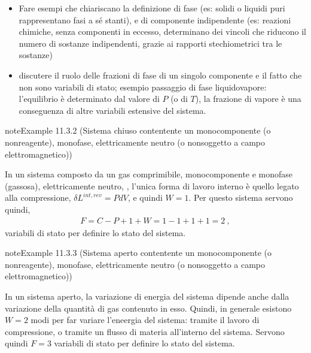 \documentclass[letterpaper,10pt,italian]{jupyterBook}
\begin{document}
\sphinxAtStartPar
{}
\begin{itemize}
\item {} 
\sphinxAtStartPar
Fare esempi che chiariscano la definizione di fase (es: solidi o liquidi puri rappresentano fasi a sé stanti), e di componente indipendente (es: reazioni chimiche, senza componenti in eccesso, determinano dei vincoli che riducono il numero di sostanze indipendenti, grazie ai rapporti stechiometrici tra le sostanze)

\item {} 
\sphinxAtStartPar
discutere il ruolo delle frazioni di fase di un singolo componente e il fatto che non sono variabili di stato; esempio passaggio di fase liquido\sphinxhyphen{}vapore: l’equilibrio è determinato dal valore di \(P\) (o di \(T\)), la frazione di vapore è una conseguenza di altre variabili estensive del sistema.

\end{itemize}
\label{ch/thermodynamics/principles-gibbs-phase-rule:example-4}
\begin{sphinxadmonition}{note}{Example 11.3.2 (Sistema chiuso contentente un monocomponente (o non\sphinxhyphen{}reagente), monofase, elettricamente neutro (o non\sphinxhyphen{}soggetto a campo elettromagnetico))}



\sphinxAtStartPar
In un sistema composto da un gas comprimibile, monocomponente e monofase (gassosa), elettricamente neutro,  , l’unica forma di lavoro interno è quello legato alla compressione, \(\delta L^{int,rev} = P dV\), e quindi \(W = 1\). Per questo sistema servono quindi,
\begin{equation*}
\begin{split}F = C - P + 1 + W = 1 - 1 + 1 + 1 = 2 \ ,\end{split}
\end{equation*}
\sphinxAtStartPar
variabili di stato per definire lo stato del sistema.
\end{sphinxadmonition}
\label{ch/thermodynamics/principles-gibbs-phase-rule:example-5}
\begin{sphinxadmonition}{note}{Example 11.3.3 (Sistema aperto contentente un monocomponente (o non\sphinxhyphen{}reagente), monofase, elettricamente neutro (o non\sphinxhyphen{}soggetto a campo elettromagnetico))}



\sphinxAtStartPar
In un sistema aperto, la variazione di energia del sistema dipende anche dalla variazione della quantità di gas contenuto in esso. Quindi, in generale esistono \(W = 2\) modi per far variare l’eneergia del sistema: tramite il lavoro di compressione, o tramite un flusso di materia all’interno del sistema. Servono quindi \(F=3\) variabili di stato per definire lo stato del sistema.
\end{sphinxadmonition}
\end{document}

